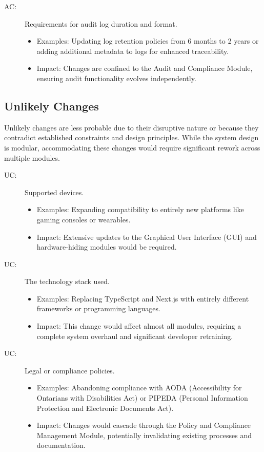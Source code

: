 \documentclass[12pt, titlepage]{article}
\newcounter{acnum}
\newcommand{\actheacnum}{AC\theacnum}
\newcounter{ucnum}
\newcommand{\uctheucnum}{UC\theucnum}
\begin{document}
\begin{description}
\item[ \actheacnum \label{acAudit}:] Requirements for audit log duration and format. 
\begin{itemize}
    \item Examples: Updating log retention policies from 6 months to 2 years or adding additional metadata to logs for enhanced traceability.
    \item Impact: Changes are confined to the Audit and Compliance Module, ensuring audit functionality evolves independently.
\end{itemize}
\end{description}

\subsection{Unlikely Changes} \label{SecUchange}

Unlikely changes are less probable due to their disruptive nature or because they contradict established constraints and design principles. While the system design is modular, accommodating these changes would require significant rework across multiple modules.

\begin{description}
\item[ \uctheucnum \label{ucDevice}:] Supported devices. 
\begin{itemize}
    \item Examples: Expanding compatibility to entirely new platforms like gaming consoles or wearables.
    \item Impact: Extensive updates to the Graphical User Interface (GUI) and hardware-hiding modules would be required.
\end{itemize}

\item[ \uctheucnum \label{ucTechStack}:] The technology stack used. 
\begin{itemize}
    \item Examples: Replacing TypeScript and Next.js with entirely different frameworks or programming languages.
    \item Impact: This change would affect almost all modules, requiring a complete system overhaul and significant developer retraining.
\end{itemize}

\item[ \uctheucnum \label{ucPolicy}:] Legal or compliance policies. 
\begin{itemize}
    \item Examples: Abandoning compliance with AODA (Accessibility for Ontarians with Disabilities Act) or PIPEDA (Personal Information Protection and Electronic Documents Act).
    \item Impact: Changes would cascade through the Policy and Compliance Management Module, potentially invalidating existing processes and documentation.
\end{itemize}
\end{description}
\end{document}
